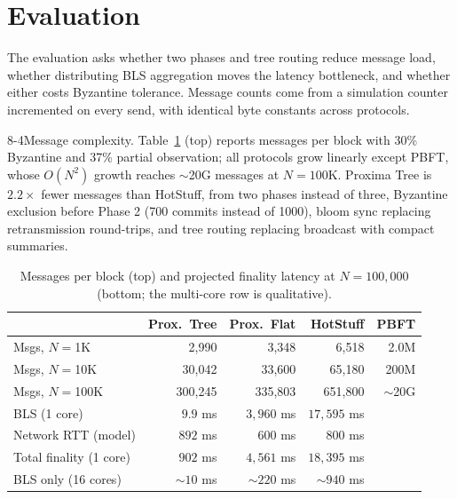 \documentclass[runningheads]{llncs}
\makeatletter
\renewcommand\paragraph{\@startsection{paragraph}{4}{\z@}%
  {8\p@ \@plus 2\p@ \@minus 2\p@}{-4\p@}{\normalfont\normalsize\bfseries\boldmath}}
\makeatother
\begin{document}
\section{Evaluation}
\label{sec:eval}
\label{sec:caveats}

The evaluation asks whether two phases and tree routing reduce message load, whether distributing BLS aggregation moves the latency bottleneck, and whether either costs Byzantine tolerance. Message counts come from a simulation counter incremented on every send, with identical byte constants across protocols.

\paragraph{Message complexity.}
Table~\ref{tab:messages} (top) reports messages per block with 30\% Byzantine and 37\% partial observation; all protocols grow linearly except PBFT, whose $O(N^2)$ growth reaches $\sim$20G messages at $N{=}100$K. Proxima Tree is $2.2\times$ fewer messages than HotStuff, from two phases instead of three, Byzantine exclusion before Phase 2 (700 commits instead of 1000), bloom sync replacing retransmission round-trips, and tree routing replacing broadcast with compact summaries.

\begin{table}[tbp]
  \caption{Messages per block (top) and projected finality latency at $N{=}100{,}000$ (bottom; the multi-core row is qualitative).}
  \label{tab:messages}
  \centering
  \footnotesize
  \begin{tabular}{@{}lrrrr@{}}
    \toprule
     & \textbf{Prox.\ Tree} & \textbf{Prox.\ Flat} & \textbf{HotStuff} & \textbf{PBFT} \\
    \midrule
    Msgs, $N{=}$1K   & 2{,}990    & 3{,}348    & 6{,}518    & 2.0M \\
    Msgs, $N{=}$10K  & 30{,}042   & 33{,}600   & 65{,}180   & 200M \\
    Msgs, $N{=}$100K & 300{,}245  & 335{,}803  & 651{,}800  & $\sim$20G \\
    \midrule
    BLS (1 core) & $9.9$ ms & $3{,}960$ ms & $17{,}595$ ms & \\
    Network RTT (model) & $892$ ms & $600$ ms & $800$ ms & \\
    Total finality (1 core) & $902$ ms & $4{,}561$ ms & $18{,}395$ ms & \\
    BLS only (16 cores) & $\sim\!10$ ms & $\sim\!220$ ms & $\sim\!940$ ms & \\
    \bottomrule
  \end{tabular}
\end{table}
\end{document}
